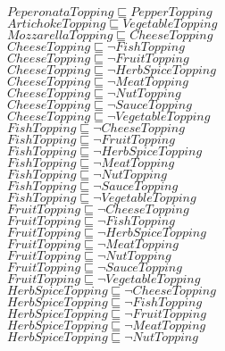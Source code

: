 \documentclass[a4paper,10pt]{article}
\begin{document}
 $PeperonataTopping \sqsubseteq PepperTopping$\\ 
 $ArtichokeTopping \sqsubseteq VegetableTopping$\\ 
 $MozzarellaTopping \sqsubseteq CheeseTopping$\\ 
 $CheeseTopping \sqsubseteq  \lnot FishTopping$\\ 
 $CheeseTopping \sqsubseteq  \lnot FruitTopping$\\ 
 $CheeseTopping \sqsubseteq  \lnot HerbSpiceTopping$\\ 
 $CheeseTopping \sqsubseteq  \lnot MeatTopping$\\ 
 $CheeseTopping \sqsubseteq  \lnot NutTopping$\\ 
 $CheeseTopping \sqsubseteq  \lnot SauceTopping$\\ 
 $CheeseTopping \sqsubseteq  \lnot VegetableTopping$\\ 
 $FishTopping \sqsubseteq  \lnot CheeseTopping$\\ 
 $FishTopping \sqsubseteq  \lnot FruitTopping$\\ 
 $FishTopping \sqsubseteq  \lnot HerbSpiceTopping$\\ 
 $FishTopping \sqsubseteq  \lnot MeatTopping$\\ 
 $FishTopping \sqsubseteq  \lnot NutTopping$\\ 
 $FishTopping \sqsubseteq  \lnot SauceTopping$\\ 
 $FishTopping \sqsubseteq  \lnot VegetableTopping$\\ 
 $FruitTopping \sqsubseteq  \lnot CheeseTopping$\\ 
 $FruitTopping \sqsubseteq  \lnot FishTopping$\\ 
 $FruitTopping \sqsubseteq  \lnot HerbSpiceTopping$\\ 
 $FruitTopping \sqsubseteq  \lnot MeatTopping$\\ 
 $FruitTopping \sqsubseteq  \lnot NutTopping$\\ 
 $FruitTopping \sqsubseteq  \lnot SauceTopping$\\ 
 $FruitTopping \sqsubseteq  \lnot VegetableTopping$\\ 
 $HerbSpiceTopping \sqsubseteq  \lnot CheeseTopping$\\ 
 $HerbSpiceTopping \sqsubseteq  \lnot FishTopping$\\ 
 $HerbSpiceTopping \sqsubseteq  \lnot FruitTopping$\\ 
 $HerbSpiceTopping \sqsubseteq  \lnot MeatTopping$\\ 
 $HerbSpiceTopping \sqsubseteq  \lnot NutTopping$\\ 
\end{document}

